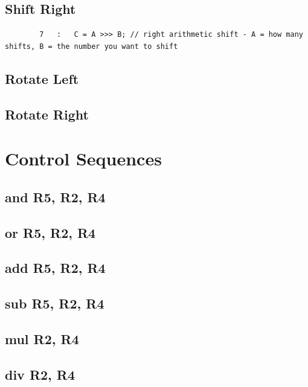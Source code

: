 \documentclass{article}
\begin{document}
    \subsection{Shift Right}
        \begin{lstlisting}
        7   :   C = A >>> B; // right arithmetic shift - A = how many shifts, B = the number you want to shift 
        \end{lstlisting}
    \subsection{Rotate Left}
        
    \subsection{Rotate Right}
        
\section{Control Sequences}
    \subsection{and R5, R2, R4} \label{AND}
        
    \subsection{or R5, R2, R4} \label{OR}
        
    \subsection{add R5, R2, R4} \label{ADD}
        
    \subsection{sub R5, R2, R4} \label{SUB}
        
    \subsection{mul R2, R4} \label{MUL}
        
    \subsection{div R2, R4} \label{DIV}
        
\end{document}
